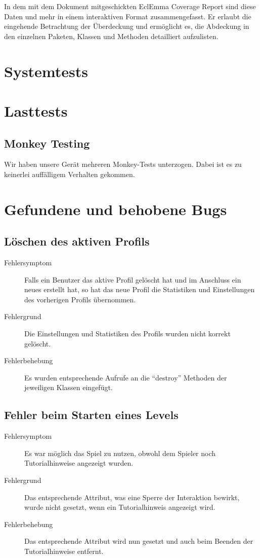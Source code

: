 \documentclass[parskip=full]{scrreprt}
\begin{document}
In dem mit dem Dokument mitgeschickten EclEmma Coverage Report sind diese Daten und mehr in einem interaktiven Format zusammengefasst. 
Er erlaubt die eingehende Betrachtung der Überdeckung und ermöglicht es, die Abdeckung in den einzelnen Paketen, Klassen und Methoden detailliert aufzulisten.

\chapter{Systemtests}

\chapter{Lasttests}

\section{Monkey Testing}

Wir haben unsere Gerät mehreren Monkey-Tests unterzogen. Dabei ist es zu keinerlei auffälligem Verhalten gekommen.

\chapter{Gefundene und behobene Bugs}

\section{Löschen des aktiven Profils}
\begin{description}
	\item[Fehlersymptom] Falls ein Benutzer das aktive Profil gelöscht hat und im Anschluss ein neues erstellt hat, so hat das neue Profil die Statistiken und Einstellungen des vorherigen Profils übernommen.
	\item[Fehlergrund] Die Einstellungen und Statistiken des Profils wurden nicht korrekt gelöscht.
	\item[Fehlerbehebung] Es wurden entsprechende Aufrufe an die \enquote{destroy} Methoden der jeweiligen Klassen eingefügt.
\end{description}

\section{Fehler beim Starten eines Levels}
\begin{description}
	\item[Fehlersymptom] Es war möglich das Spiel zu nutzen, obwohl dem Spieler noch Tutorialhinweise angezeigt wurden.
	\item[Fehlergrund] Das entsprechende Attribut, was eine Sperre der Interaktion bewirkt, wurde nicht gesetzt, wenn ein Tutorialhinweis angezeigt wird.
	\item[Fehlerbehebung] Das entsprechende Attribut wird nun gesetzt und auch beim Beenden der Tutorialhinweise entfernt.
\end{description}
\end{document}
